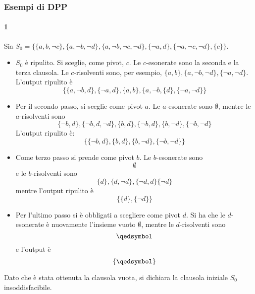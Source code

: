 \subsubsection{Esempi di DPP}
\paragraph{1}
Sia $S_0 = \{\{a,b,\neg c\}, \{a, \neg b, \neg d\}, \{a, \neg b, \neg c, \neg d\}, 
\{\neg a, d\}, \{\neg a, \neg c, \neg d\}, \{c\}\}$. 
\begin{itemize}
        \item $S_0$ è ripulito. Si sceglie, come pivot, $c$. 
        Le $c$-esonerate sono la seconda e la terza clausola. 
Le $c$-risolventi sono, per esempio, $\{a,b\}, \{a, \neg b, \neg d\}, \{\neg a, \neg d\}$. 
L'output ripulito è 
$$
\{\{a, \neg b, d\}, \{\neg a, d\}, \{a, b\}, \{a, \neg b, \{d\}, \{\neg a, \neg d\}\}
        $$
\item Per il secondo passo, si sceglie come pivot $a$. 
Le $a$-esonerate sono $\emptyset$, mentre le $a$-risolventi sono 
$$
\{\neg b, d\}, \{\neg b, d, \neg d\}, \{b, d\}, \{\neg b, d\}, \{b, \neg d\}, \{\neg b, \neg d\}
$$
L'output ripulito è: 
$$
\{\{\neg b, d\}, \{b, d\}, \{b, \neg d\}, \{\neg b, \neg d\}\}
$$
\item Come terzo passo si prende come pivot $b$. Le $b$-esonerate sono 
$$
\emptyset
$$
e le $b$-risolventi sono 
$$
\{d\},\{d, \neg d\}, \{\neg d, d\} \{\neg d\}
$$
mentre l'output ripulito è 
$$
\{\{d\}, \{\neg d\}\}
$$
\item Per l'ultimo passo si è obbligati a scegliere come pivot $d$. 
Si ha che le $d$-esonerate è nuovamente l'insieme vuoto $\emptyset$, 
mentre le $d$-risolventi sono 
$$
\qedsymbol
$$
e l'output è 
$$
\{\qedsymbol\}
$$
\end{itemize}
Dato che è stata ottenuta la clausola vuota, si dichiara la clausola 
iniziale $S_0$ insoddisfacibile. 
